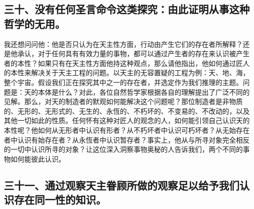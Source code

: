 \subsection{三十、没有任何圣言命令这类探究：由此证明从事这种哲学的无用。}

我还想问问他：他是否只认为在天主性方面，行动由产生它们的存在者所解释？还是他承认，对于任何具有有效力量的事物，都可以通过产生者的存在来认识被产生者的本性？如果只有在天主性方面他持这种观点，那么请他指出，他如何通过匠人的本性来解决关于天主工程的问题。以天主的无容置疑的工程为例：天、地、海，整个宇宙。假设我们正在探究其中之一的存在者，并选定作为我们推理的主题。问题是：天的本体是什么？对此，各位自然哲学家根据各自的理解提出了广泛不同的见解。那么，对天的制造者的默观如何能解决这个问题呢？那位制造者是非物质的、无形的、无形式的、无生的、永恆的、不朽坏的、不变易的、不改动的，以及其他一切如此的性质。任何怀有这种对匠人的观念的人，如何能引领自己认识天的本性呢？他如何从无形者中认识有形者？从不朽坏者中认识可朽坏者？从无始存在者中认识有始存在者？从永恆者中认识暂存者？事实上，他从与所寻对象完全相反的一切中认识所寻的对象？让这位深入洞察事物奥秘的人告诉我们，两个不同的事物如何能彼此认识。\par


\subsection{三十一、通过观察天主眷顾所做的观察足以给予我们认识存在同一性的知识。}

